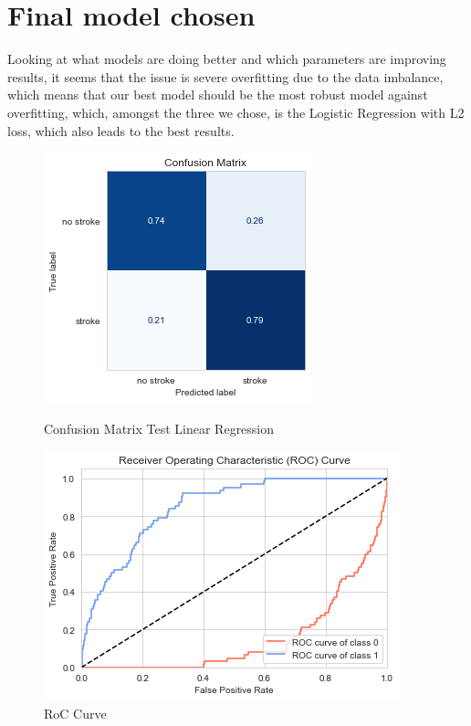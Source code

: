 \documentclass[11pt, a4paper]{article}
\begin{document}
\section{Final model chosen}

Looking at what models are doing better and which parameters are improving results, it seems that the issue is severe overfitting due to the data imbalance, which means that our best model should be the most robust model against overfitting, which, amongst the three we chose, is the Logistic Regression with L2 loss, which also leads to the best results.


\begin{figure}[H]
    \includegraphics[width=\textwidth]{images/LogRedResult.png}
    \caption{Confusion Matrix Test Linear Regression}
    \label{fig:logRegFinal}
\endminipage\hfill
{}
    \includegraphics[width=\textwidth]{images/rocFinak.png}
    \caption{RoC Curve}
    \label{fig:RoCCurve}
\endminipage\hfill
\end{figure}
\end{document}
